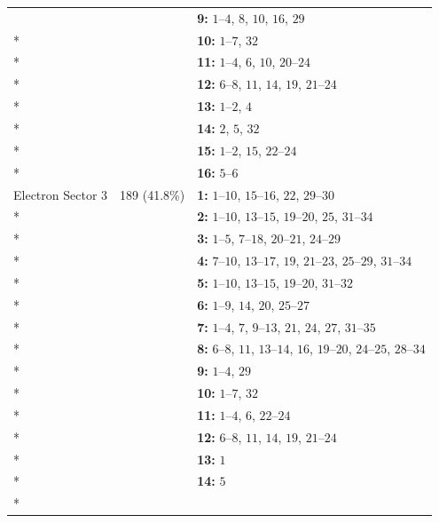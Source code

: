\begin{longtable}{p{3.5cm}p{2.2cm}p{8.3cm}}
 &  & \textbf{9:} \mbox{$1$--$4$}, \mbox{$8$}, \mbox{$10$}, \mbox{$16$}, \mbox{$29$} \\*
 &  & \textbf{10:} \mbox{$1$--$7$}, \mbox{$32$} \\*
 &  & \textbf{11:} \mbox{$1$--$4$}, \mbox{$6$}, \mbox{$10$}, \mbox{$20$--$24$} \\*
 &  & \textbf{12:} \mbox{$6$--$8$}, \mbox{$11$}, \mbox{$14$}, \mbox{$19$}, \mbox{$21$--$24$} \\*
 &  & \textbf{13:} \mbox{$1$--$2$}, \mbox{$4$} \\*
 &  & \textbf{14:} \mbox{$2$}, \mbox{$5$}, \mbox{$32$} \\*
 &  & \textbf{15:} \mbox{$1$--$2$}, \mbox{$15$}, \mbox{$22$--$24$} \\*
 &  & \textbf{16:} \mbox{$5$--$6$} \\
\addlinespace
Electron Sector 3 & 189 (41.8\%) & \textbf{1:} \mbox{$1$--$10$}, \mbox{$15$--$16$}, \mbox{$22$}, \mbox{$29$--$30$} \\*
 &  & \textbf{2:} \mbox{$1$--$10$}, \mbox{$13$--$15$}, \mbox{$19$--$20$}, \mbox{$25$}, \mbox{$31$--$34$} \\*
 &  & \textbf{3:} \mbox{$1$--$5$}, \mbox{$7$--$18$}, \mbox{$20$--$21$}, \mbox{$24$--$29$} \\*
 &  & \textbf{4:} \mbox{$7$--$10$}, \mbox{$13$--$17$}, \mbox{$19$}, \mbox{$21$--$23$}, \mbox{$25$--$29$}, \mbox{$31$--$34$} \\*
 &  & \textbf{5:} \mbox{$1$--$10$}, \mbox{$13$--$15$}, \mbox{$19$--$20$}, \mbox{$31$--$32$} \\*
 &  & \textbf{6:} \mbox{$1$--$9$}, \mbox{$14$}, \mbox{$20$}, \mbox{$25$--$27$} \\*
 &  & \textbf{7:} \mbox{$1$--$4$}, \mbox{$7$}, \mbox{$9$--$13$}, \mbox{$21$}, \mbox{$24$}, \mbox{$27$}, \mbox{$31$--$35$} \\*
 &  & \textbf{8:} \mbox{$6$--$8$}, \mbox{$11$}, \mbox{$13$--$14$}, \mbox{$16$}, \mbox{$19$--$20$}, \mbox{$24$--$25$}, \mbox{$28$--$34$} \\*
 &  & \textbf{9:} \mbox{$1$--$4$}, \mbox{$29$} \\*
 &  & \textbf{10:} \mbox{$1$--$7$}, \mbox{$32$} \\*
 &  & \textbf{11:} \mbox{$1$--$4$}, \mbox{$6$}, \mbox{$22$--$24$} \\*
 &  & \textbf{12:} \mbox{$6$--$8$}, \mbox{$11$}, \mbox{$14$}, \mbox{$19$}, \mbox{$21$--$24$} \\*
 &  & \textbf{13:} \mbox{$1$} \\*
 &  & \textbf{14:} \mbox{$5$} \\*

\end{longtable}
